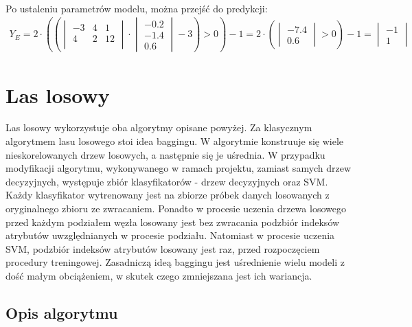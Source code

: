 \documentclass[
    left=2.5cm,         %
    right=2.5cm,        %
    top=2.5cm,          %
    bottom=3cm,         %
    bindingoffset=6mm,  %
    nohyphenation=false %
]{eiti/eiti-report}
\begin{document}
\\
    Po ustaleniu parametrów modelu, można przejść do predykcji:
\begin{gather*}
    Y_E = 2\cdot (
            (\begin{vmatrix}
                -3&4&1\\
                4&2&12\\
            \end{vmatrix}
            \cdot 
            \begin{vmatrix}
                -0.2\\
                -1.4\\
                0.6
            \end{vmatrix} 
            - 3
            ) 
        > 0) -1 = 
        2 \cdot (
        \begin{vmatrix}
                -7.4\\
                0.6
        \end{vmatrix} 
        > 0) - 1 = 
        \begin{vmatrix}
                -1\\
                1
        \end{vmatrix} 
\end{gather*}

\section{Las losowy}
Las losowy wykorzystuje oba algorytmy opisane powyżej. Za klasycznym algorytmem lasu losowego stoi idea baggingu. W algorytmie konstruuje się wiele nieskorelowanych drzew losowych, a następnie się je uśrednia. W przypadku modyfikacji algorytmu, wykonywanego w ramach projektu, zamiast samych drzew decyzyjnych, występuje zbiór klasyfikatorów - drzew decyzyjnych oraz SVM. Każdy klasyfikator wytrenowany jest na zbiorze próbek danych losowanych z oryginalnego zbioru ze zwracaniem. Ponadto w procesie uczenia drzewa losowego przed każdym podziałem węzła losowany jest bez zwracania podzbiór indeksów atrybutów uwzględnianych w procesie podziału. Natomiast w procesie uczenia SVM, podzbiór indeksów atrybutów losowany jest raz, przed rozpoczęciem procedury treningowej. Zasadniczą ideą baggingu jest uśrednienie wielu modeli z dość małym obciążeniem, w skutek czego zmniejszana jest ich wariancja.

\subsection{Opis algorytmu}
\end{document}
